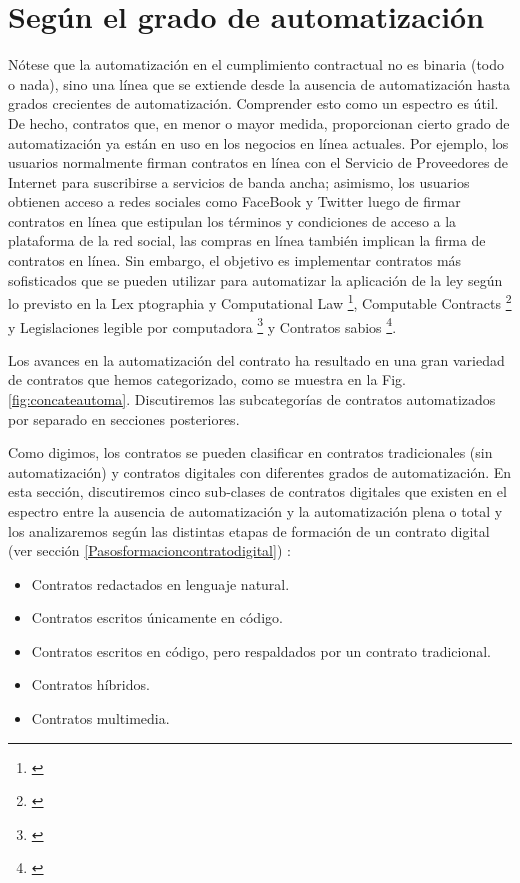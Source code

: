 \documentclass[12pt]{report} %
\begin{document}
\section{Según el grado de automatización}
\label{contautoma}
Nótese que la automatización en el cumplimiento contractual no es binaria (todo o nada), sino una línea que se extiende desde la ausencia de automatización hasta grados crecientes de automatización. Comprender esto como un espectro es útil. De hecho, contratos que, en menor o mayor medida, proporcionan cierto grado de automatización ya están en uso en los negocios en línea actuales. Por ejemplo, los usuarios normalmente firman contratos en línea con el Servicio de Proveedores de Internet para suscribirse a servicios de banda ancha; asimismo, los usuarios obtienen acceso a redes sociales como FaceBook y Twitter luego de firmar contratos en línea que estipulan los términos y condiciones de acceso a la plataforma de la red social, las compras en línea también implican la firma de contratos en línea. Sin embargo, el objetivo es implementar contratos más sofisticados que se pueden utilizar para automatizar la aplicación de la ley según lo previsto en la Lex ptographia\footnotesize{\cite{PrimaveraAaron2018}}  y Computational Law \footnote{\cite{Michael2005}}, Computable Contracts \footnote{\cite{Michael2005}} y Legislaciones legible por computadora \footnote{\cite{Eva2020}}  y Contratos sabios \footnote{\cite{Eva2020,James2017}}.

Los avances en la automatización del contrato ha resultado en una gran variedad de contratos que hemos categorizado, como se muestra en la Fig.\ref{fig:concateautoma}. Discutiremos las subcategorías de contratos automatizados por separado en secciones posteriores.

 
Como digimos, los contratos se pueden clasificar en contratos tradicionales (sin automatización) y contratos digitales con diferentes grados de automatización. En esta sección, discutiremos cinco sub-clases de contratos digitales que existen en el espectro entre la ausencia de automatización y la automatización plena o total y los analizaremos según las distintas etapas de formación de un contrato digital (ver sección \ref{Pasosformacioncontratodigital}) :

\begin{itemize}
    \item Contratos redactados en lenguaje natural.
    \item Contratos escritos únicamente en código.
    \item Contratos escritos en código, pero respaldados por un contrato tradicional.
    \item Contratos híbridos.
    \item Contratos multimedia.   
\end{itemize}
\end{document}
